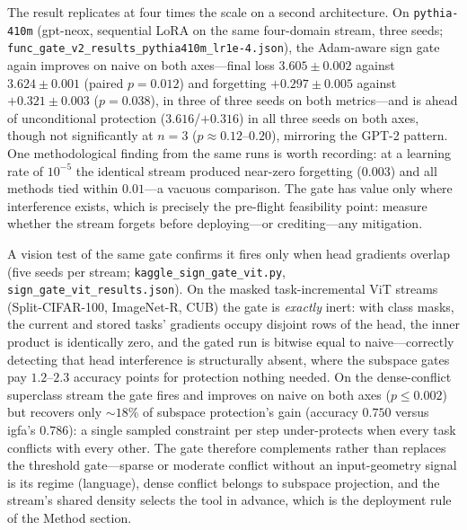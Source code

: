 \documentclass[10pt,a4paper]{article}
\theoremstyle{plain}
\theoremstyle{definition}
\newcommand{\IGFA}{igfa}
\begin{document}
The result replicates at four times the scale on a second architecture. On
\texttt{pythia-410m} (gpt-neox, sequential LoRA on the same four-domain stream, three
seeds; \texttt{func\_gate\_v2\_results\_pythia410m\_lr1e-4.json}), the Adam-aware sign
gate again improves on naive on both axes---final loss $3.605\pm0.002$ against
$3.624\pm0.001$ (paired $p=0.012$) and forgetting $+0.297\pm0.005$ against
$+0.321\pm0.003$ ($p=0.038$), in three of three seeds on both metrics---and is ahead of
unconditional protection ($3.616$/$+0.316$) in all three seeds on both axes, though not
significantly at $n=3$ ($p\approx0.12$--$0.20$), mirroring the GPT-2 pattern. One
methodological finding from the same runs is worth recording: at a learning rate of
$10^{-5}$ the identical stream produced near-zero forgetting ($0.003$) and all methods
tied within $0.01$---a vacuous comparison. The gate has value only where interference
exists, which is precisely the pre-flight feasibility point: measure whether the stream
forgets before deploying---or crediting---any mitigation.

A vision test of the same gate confirms it fires only when head gradients overlap (five seeds per stream;
\texttt{kaggle\_sign\_gate\_vit.py}, \texttt{sign\_gate\_vit\_results.json}). On the
masked task-incremental ViT streams (Split-CIFAR-100, ImageNet-R, CUB) the gate is
\emph{exactly} inert: with class masks, the current and stored tasks' gradients occupy
disjoint rows of the head, the inner product is identically zero, and the gated run is
bitwise equal to naive---correctly detecting that head interference is structurally
absent, where the subspace gates pay $1.2$--$2.3$ accuracy points for protection nothing
needed. On the dense-conflict superclass stream the gate fires and improves on naive on
both axes ($p\le0.002$) but recovers only ${\sim}18\%$ of subspace protection's gain
(accuracy $0.750$ versus \IGFA{}'s $0.786$): a single sampled constraint per step
under-protects when every task conflicts with every other. The gate therefore
complements rather than replaces the threshold gate---sparse or moderate conflict
without an input-geometry signal is its regime (language), dense conflict belongs to
subspace projection, and the stream's shared density selects the tool in advance, which
is the deployment rule of the Method section.
\end{document}
